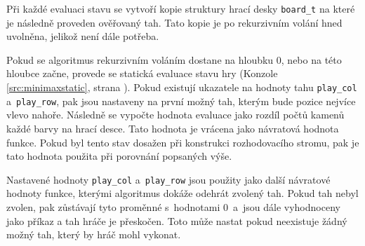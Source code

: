 



\newpage

Při každé evaluaci stavu se vytvoří kopie struktury hrací desky \lstinline{board_t} na které je následně proveden ověřovaný tah. Tato kopie je po rekurzivním volání hned uvolněna, jelikož není dále potřeba.

Pokud se algoritmus rekurzivním voláním dostane na hloubku $0$, nebo na této hloubce začne, provede se statická evaluace stavu hry (Konzole \ref{src:minimaxstatic}, strana \pageref{src:minimaxstatic}). Pokud existují ukazatele na hodnoty tahu \lstinline{play_col} a~\lstinline{play_row}, pak jsou nastaveny na první možný tah, kterým bude pozice nejvíce vlevo nahoře. Následně se vypočte hodnota evaluace jako rozdíl počtů kamenů každé barvy na hrací desce. Tato hodnota je vrácena jako návratová hodnota funkce. Pokud byl tento stav dosažen při konstrukci rozhodovacího stromu, pak je tato hodnota použita při porovnání popsaných výše.

Nastavené hodnoty \lstinline{play_col} a~\lstinline{play_row} jsou použity jako další návratové hodnoty funkce, kterými algoritmus dokáže odehrát zvolený tah. Pokud tah nebyl zvolen, pak zůstávají tyto proměnné s~hodnotami $0$~a~jsou dále vyhodnoceny jako příkaz  a tah hráče je přeskočen. Toto může nastat pokud neexistuje žádný možný tah, který by hráč mohl vykonat.
